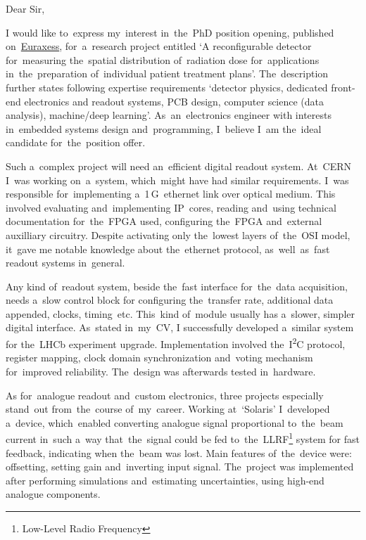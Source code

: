 \documentclass[11pt,a4paper,sans]{article}
\newcommand{\iic}{I\textsuperscript{2}C}
\begin{document}
	\noindent
	Dear Sir,
	\vspace{1\baselineskip}
	
	I would like to~express my~interest in~the~PhD position opening, published 
	on~\href{https://euraxess.ec.europa.eu/jobs/485237}{Euraxess}, for~a~research project
	entitled `A reconfigurable detector for~measuring the~spatial distribution 
	of~radiation dose for~applications in~the~preparation of~individual patient treatment
	plans'. The~description further states following expertise requirements `detector physics,
	dedicated front-end electronics and readout systems, PCB design, computer science (data
	analysis), machine/deep learning'. As~an~electronics engineer with interests in~embedded 
	systems design and~programming, I~believe I~am the~ideal candidate for~the~position offer.
	
	Such a~complex project will need an~efficient digital 
	readout	system. At~CERN I~was working on~a~system, which~might have had similar requirements. 
	I~was responsible 
	for~implementing a~1$\,$G~ethernet link over optical medium. This involved evaluating
	and~implementing IP~cores, reading and~using technical 
	documentation for~the~FPGA used, configuring the~FPGA and~external auxilliary circuitry. 
	Despite activating only the~lowest layers of~the~OSI model, it~gave me 
	notable knowledge about the~ethernet protocol, as~well~as~fast 
	readout systems in~general. 
	
	Any kind of~readout system, beside the~fast interface for~the~data acquisition, needs a~slow
	control block for configuring the~transfer rate, additional data appended, clocks, timing~etc. 
	This~kind
	of~module usually has a~slower, simpler digital interface. As~stated in~my~CV, I successfully
	developed a~similar system for the~LHCb experiment upgrade. Implementation involved 
	the~\iic\space 
	protocol, register mapping, clock domain synchronization and~voting
	mechanism for~improved reliability. The~design was afterwards tested in~hardware.
	
	As for~analogue readout and~custom electronics, three projects especially stand~out 
	from~the~course of~my~career. Working at~`Solaris' I~developed a~device, which~enabled 
	converting analogue signal proportional to~the~beam current in~such a~way that~the~signal
	could be fed to~the~LLRF\footnote{Low-Level Radio Frequency} system for fast feedback, indicating 
	when the~beam
	was lost. Main features of~the~device were: offsetting, setting gain and~inverting input signal.
	The~project was implemented after performing simulations and~estimating uncertainties, using 
	high-end analogue components.
	
\end{document}
